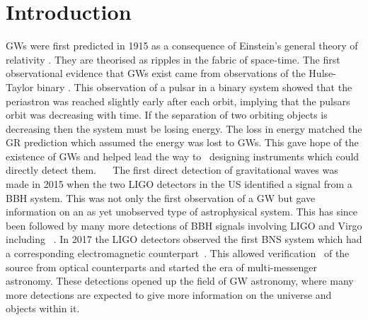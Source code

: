 \chapter{\label{intro}Introduction}


\Glspl{GW} were first predicted in 1915 as a consequence of Einstein's general
theory of relativity \citep{einstein2005GrundlageAllgemeinen}.  They are
theorised as ripples in the fabric of space-time.  The first observational
evidence that \glspl{GW} exist came from observations of the Hulse-Taylor
binary \citep{weisberg1981GravitationalWaves,weisberg2004RelativisticBinary}.
This observation of a pulsar in a binary system showed that the periastron was
reached slightly early after each orbit, implying that the pulsars orbit was
decreasing with time.  If the separation of two orbiting objects is decreasing
then the system must be losing energy.  The loss in energy matched the \gls{GR}
prediction which assumed the energy was lost to \glspl{GW}.  This gave hope of
the existence of \glspl{GW} and helped lead the way
to~ designing instruments
which could directly detect them.~ ~ The first direct detection of gravitational
waves was made in 2015 when the two \gls{LIGO} detectors in the US
\citep{abbott2016ObservationGravitational} identified a signal from a \gls{BBH}
system.  This was not only the first observation of a \gls{GW} but gave
information on an as yet unobserved type of astrophysical
system.  This has since been followed by many more detections of \gls{BBH}
signals involving \gls{LIGO} and Virgo including
\citep{abbott2017GW170814ThreeDetector,theligoscientificcollaboration2020GW190425Observation}~.  In 2017 the \gls{LIGO} detectors observed the
first \gls{BNS} system \citep{abbott2017GW170817Observation} which had a
corresponding electromagnetic counterpart~.  This allowed verification~ of the source from optical counterparts and started the era of
multi-messenger astronomy.  These detections opened up the field of
\gls{GW} astronomy, where many more detections are expected to give more
information on the universe and objects within it.

